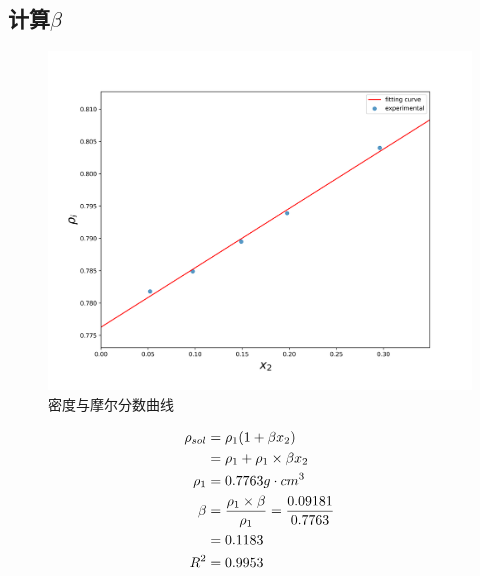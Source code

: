 \documentclass[a4paper]{article}
\begin{document}
\subsection{计算$\beta$}
\begin{figure}[H]
	\centering
	\includegraphics[width = 0.5\paperwidth]{fig/density.png}
	\caption{密度与摩尔分数曲线}
\end{figure}
\begin{equation}
	\centering
	\begin{aligned}
		\rho_{sol} &= \rho_{1}(1+\beta x_{2})\\
							&=\rho_{1} + \rho_{1}\times \beta x_{2}\\
		\rho_{1} &= 0.7763g\cdot cm^{3}\\
		\beta &= \frac{\rho_{1}\times \beta}{\rho_{1}} = \frac{0.09181}{0.7763}\\
					&= 0.1183\\
		R^{2} &= 0.9953\\
	\end{aligned}
\end{equation}
\end{document}
